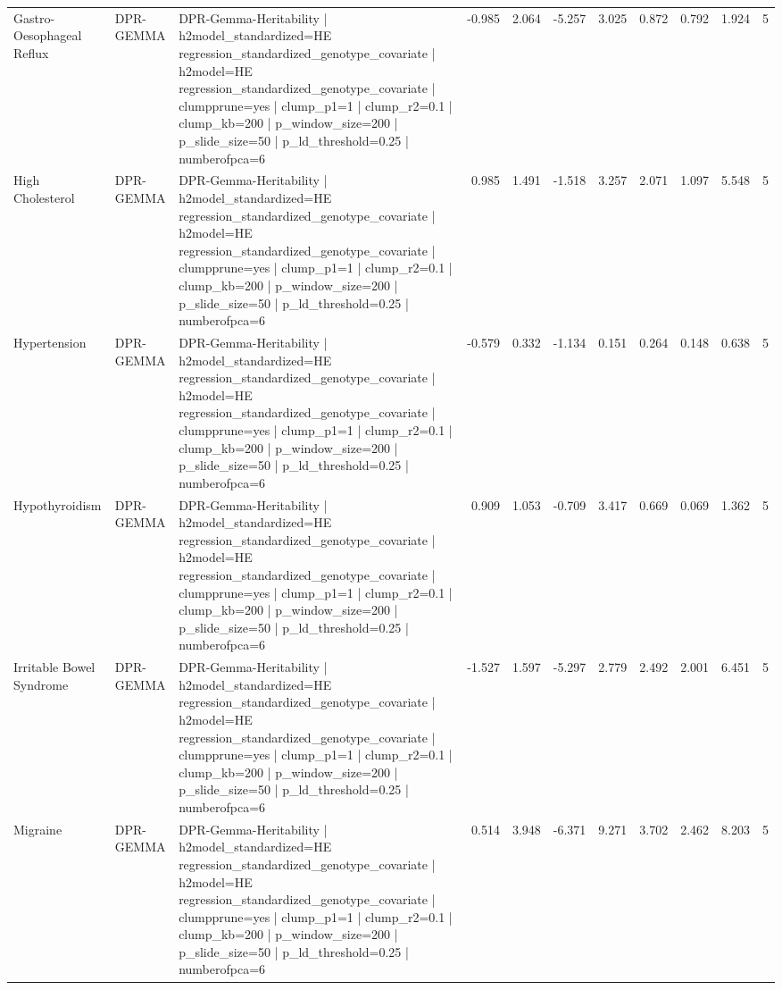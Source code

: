 \begin{landscape}
\begin{longtable}{p{2.4cm}p{1.8cm}p{6.0cm}rrrrrrrr}
Gastro-Oesophageal Reflux & DPR-GEMMA & DPR-Gemma-Heritability | h2model\_standardized=HE regression\_standardized\_genotype\_covariate | h2model=HE regression\_standardized\_genotype\_covariate | clumpprune=yes | clump\_p1=1 | clump\_r2=0.1 | clump\_kb=200 | p\_window\_size=200 | p\_slide\_size=50 | p\_ld\_threshold=0.25 | numberofpca=6 & -0.985 & 2.064 & -5.257 & 3.025 & 0.872 & 0.792 & 1.924 & 5 \\
High Cholesterol & DPR-GEMMA & DPR-Gemma-Heritability | h2model\_standardized=HE regression\_standardized\_genotype\_covariate | h2model=HE regression\_standardized\_genotype\_covariate | clumpprune=yes | clump\_p1=1 | clump\_r2=0.1 | clump\_kb=200 | p\_window\_size=200 | p\_slide\_size=50 | p\_ld\_threshold=0.25 | numberofpca=6 & 0.985 & 1.491 & -1.518 & 3.257 & 2.071 & 1.097 & 5.548 & 5 \\
Hypertension & DPR-GEMMA & DPR-Gemma-Heritability | h2model\_standardized=HE regression\_standardized\_genotype\_covariate | h2model=HE regression\_standardized\_genotype\_covariate | clumpprune=yes | clump\_p1=1 | clump\_r2=0.1 | clump\_kb=200 | p\_window\_size=200 | p\_slide\_size=50 | p\_ld\_threshold=0.25 | numberofpca=6 & -0.579 & 0.332 & -1.134 & 0.151 & 0.264 & 0.148 & 0.638 & 5 \\
Hypothyroidism & DPR-GEMMA & DPR-Gemma-Heritability | h2model\_standardized=HE regression\_standardized\_genotype\_covariate | h2model=HE regression\_standardized\_genotype\_covariate | clumpprune=yes | clump\_p1=1 | clump\_r2=0.1 | clump\_kb=200 | p\_window\_size=200 | p\_slide\_size=50 | p\_ld\_threshold=0.25 | numberofpca=6 & 0.909 & 1.053 & -0.709 & 3.417 & 0.669 & 0.069 & 1.362 & 5 \\
Irritable Bowel Syndrome & DPR-GEMMA & DPR-Gemma-Heritability | h2model\_standardized=HE regression\_standardized\_genotype\_covariate | h2model=HE regression\_standardized\_genotype\_covariate | clumpprune=yes | clump\_p1=1 | clump\_r2=0.1 | clump\_kb=200 | p\_window\_size=200 | p\_slide\_size=50 | p\_ld\_threshold=0.25 | numberofpca=6 & -1.527 & 1.597 & -5.297 & 2.779 & 2.492 & 2.001 & 6.451 & 5 \\
Migraine & DPR-GEMMA & DPR-Gemma-Heritability | h2model\_standardized=HE regression\_standardized\_genotype\_covariate | h2model=HE regression\_standardized\_genotype\_covariate | clumpprune=yes | clump\_p1=1 | clump\_r2=0.1 | clump\_kb=200 | p\_window\_size=200 | p\_slide\_size=50 | p\_ld\_threshold=0.25 | numberofpca=6 & 0.514 & 3.948 & -6.371 & 9.271 & 3.702 & 2.462 & 8.203 & 5 \\

\end{longtable}
\end{landscape}

